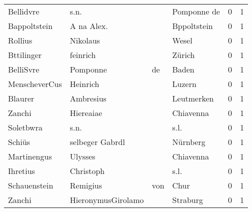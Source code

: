 \begin{tabular}{llllrr}
                Bellidvre &                               s.n. &             &                                 Pomponne de &          0 &         1 \\
             Bappoltstein &                         A na Alex. &             &                                 Bppoltstein &          0 &         1 \\
                  Rollius &                           Nikolaus &             &                                       Wesel &          0 &         1 \\
               Bttilinger &                           feinrich &             &                                      Zürich &          0 &         1 \\
                BelliSvre &                           Pomponne &          de &                                       Baden &          0 &         1 \\
            MenscheverCus &                           Heinrich &             &                                      Luzern &          0 &         1 \\
                  Blaurer &                          Ambresius &             &                                  Leutmerken &          0 &         1 \\
                   Zanchi &                          Hiereaiae &             &                                   Chiavenna &          0 &         1 \\
                Soletbwra &                               s.n. &             &                                        s.l. &          0 &         1 \\
                   Schiüs &                    selbeger Gabrdl &             &                                    Nürnberg &          0 &         1 \\
              Martinengus &                            Ulysses &             &                                   Chiavenna &          0 &         1 \\
                 Ihretius &                          Christoph &             &                                        s.l. &          0 &         1 \\
             Schauenstein &                           Remigius &         von &                                        Chur &          0 &         1 \\
                   Zanchi &                 HieronymusGirolamo &             &                                    Straburg &          0 &         1 \\

\end{tabular}
